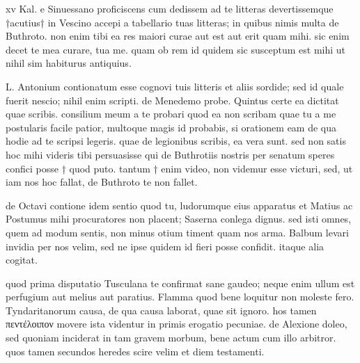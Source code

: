 


 xv Kal. e Sinuessano proficiscens cum dedissem ad te litteras devertissemque †acutius† in Vescino accepi a tabellario tuas litteras; in quibus nimis multa de Buthroto. non enim tibi ea res maiori curae aut est aut erit quam mihi. sic enim decet te mea curare, tua me. quam ob rem id quidem sic susceptum est mihi ut nihil sim habiturus antiquius.

 L. Antonium contionatum esse cognovi tuis litteris et aliis sordide; sed id quale fuerit nescio; nihil enim scripti. de Menedemo probe. Quintus certe ea dictitat quae scribis. consilium meum a te probari quod ea non scribam quae tu a me postularis facile patior, multoque magis id probabis, si orationem eam de qua hodie ad te scripsi legeris. quae de legionibus scribis, ea vera sunt. sed non satis hoc mihi videris tibi persuasisse qui de Buthrotiis nostris per senatum speres confici posse † quod puto. tantum † enim video, non videmur esse victuri, sed, ut iam nos hoc fallat, de Buthroto te non fallet.

 de Octavi contione idem sentio quod tu, ludorumque eius apparatus et Matius ac Postumus mihi procuratores non placent; Saserna conlega dignus. sed isti omnes, quem ad modum sentis, non minus otium timent quam nos arma. Balbum levari invidia per nos velim, sed ne ipse quidem id fieri posse confidit. itaque alia cogitat.

 quod prima disputatio Tusculana te confirmat sane gaudeo; neque enim ullum est perfugium aut melius aut paratius. Flamma quod bene loquitur non moleste fero. Tyndaritanorum causa, de qua causa laborat, quae sit ignoro. hos tamen πεντέλοιπον movere ista videntur in primis erogatio pecuniae. de Alexione doleo, sed quoniam inciderat in tam gravem morbum, bene actum cum illo arbitror. quos tamen secundos heredes scire velim et diem testamenti.
